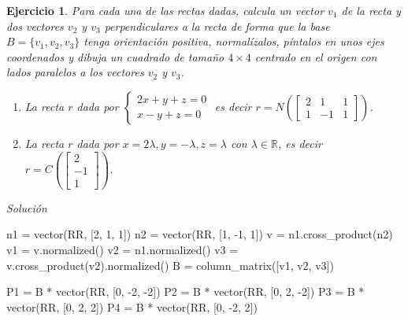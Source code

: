 \documentclass{amsart}
\newtheorem{ejer}{Ejercicio}
\begin{document}


\begin{ejer}
Para cada una de las rectas dadas, calcula un vector $v_1$ de la recta y dos vectores 
$v_2$ y $v_3$ perpendiculares a la recta de forma que la base $B = \{v_1,v_2,v_3\}$ tenga 
orientación positiva, normalízalos, píntalos en unos ejes coordenados y dibuja un cuadrado de 
tamaño $4\times 4$ centrado en el origen con lados paralelos a los vectores $v_2$ y $v_3$.

\begin{enumerate}
\item La recta $r$ dada por 
$
\begin{cases}
2x+y+z = 0 \\
x-y+z = 0
\end{cases}
$ es decir $r = N\left(\left[\begin{array}{ccc} 2 & 1 & 1 \\ 1 & -1 & 1 \end{array} \right]\right)$.
\item La recta $r$ dada por $x = 2\lambda, y = -\lambda, z = \lambda$ 
con $\lambda \in {\mathbb R}$, es decir
$r = C\left(\left[\begin{array}{c} 2 \\ -1 \\ 1 \end{array} \right]\right)$.
\end{enumerate}
\end{ejer}

{\it Solución}


\begin{sageblock}
n1 = vector(RR, [2, 1, 1])
n2 = vector(RR, [1, -1, 1])
v = n1.cross_product(n2)
v1 = v.normalized()
v2 = n1.normalized()
v3 = v.cross_product(v2).normalized()
B = column_matrix([v1, v2, v3])

P1 = B * vector(RR, [0, -2, -2])
P2 = B * vector(RR, [0, 2, -2])
P3 = B * vector(RR, [0, 2, 2])
P4 = B * vector(RR, [0, -2, 2])
\end{sageblock}

\begin{sagesub}
\begin{center}
\end{center}
\end{sagesub}
\end{document}
